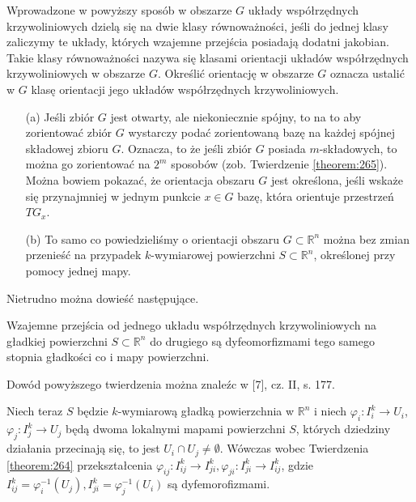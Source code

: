 \documentclass[leqno]{article}
\begin{document}
\begin{justify}
\begin{defn}
    Wprowadzone w powyższy sposób w obszarze $G$ układy współrzędnych krzywoliniowych dzielą się na dwie klasy równoważności, jeśli do jednej klasy zaliczymy 
    te układy, których wzajemne przejścia posiadają dodatni jakobian. Takie klasy równoważności nazywa się klasami orientacji układów współrzędnych krzywoliniowych 
    w obszarze $G$. Określić orientację w obszarze $G$ oznacza ustalić w $G$ klasę orientacji jego układów współrzędnych krzywoliniowych.
\end{defn}

\begin{uwaga}
    \begin{itemize}
        \item [(a)]
            Jeśli zbiór $G$ jest otwarty, ale niekoniecznie spójny, to na to aby zorientować zbiór $G$ wystarczy podać 
            zorientowaną bazę na każdej spójnej składowej zbioru $G$. Oznacza, to że jeśli zbiór $G$ posiada $m$-składowych, to można go 
            zorientować na $2^m$ sposobów (zob. Twierdzenie \ref{theorem:265}).
            Można bowiem pokazać, że orientacja obszaru $G$ jest określona, jeśli wskaże się przynajmniej w jednym punkcie $x \in G$ bazę,
            która orientuje przestrzeń $TG_x$.
        \item [(b)]
            To samo co powiedzieliśmy o orientacji obszaru $G \subset \mathbb{R}^n$ można bez zmian przenieść na przypadek $k$-wymiarowej powierzchni $S \subset \mathbb{R}^n$,
            określonej przy pomocy jednej mapy.
    \end{itemize}
\end{uwaga}

Nietrudno można dowieść następujące.

\begin{theorem}
{
    Wzajemne przejścia od jednego układu współrzędnych krzywoliniowych na gładkiej powierzchni $S \subset \mathbb{R}^n$ do drugiego są dyfeomorfizmami tego samego 
    stopnia gładkości co i mapy powierzchni.
}
\end{theorem}

Dowód powyższego twierdzenia można znaleźc w [7], cz. II, s. 177.

Niech teraz $S$ będzie $k$-wymiarową gładką powierzchnia w $\mathbb{R}^n$ i niech $\varphi_i : I_i^k \to U_i$, $\varphi_j : I^k_j \to U_j$
będą dwoma lokalnymi mapami powierzchni $S$, których dziedziny działania przecinają się, to jest $U_i \cap U_j \neq \emptyset$.
Wówczas wobec Twierdzenia \ref{theorem:264} przekształcenia $\varphi_{ij} : I^k_{ij} \to I^{k}_{ji}, \varphi_{ji} : I^k_{ji} \to I^k_{ij}$,
gdzie $I^k_{ij} = \varphi_i^{-1}(U_j), I^k_{ji} = \varphi_j^{-1}(U_i)$ są dyfemorofizmami.


\end{justify}
\end{document}
